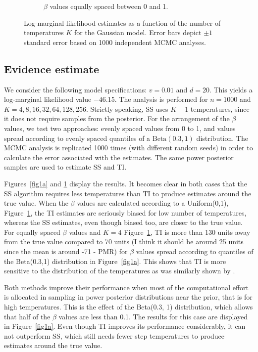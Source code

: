 \documentclass[aps,reprint,amsmath,amssymb,showpacs,showkeys]{revtex4-1}%
\newcommand{\cb}{ \color{blue}}
\begin{document}
\begin{figure}[]
\begin{subfigure}{0.50\textwidth}
		\caption{$\beta$ values equally spaced between 0 and 1.} %
		\label{fig1b}
	\end{subfigure}	
	\caption{Log-marginal likelihood estimates as a function of the number of temperatures $K$ for the Gaussian model.  Error bars depict $\pm1$ standard error based on 1000 independent MCMC analyses.}		
	\label{fig1}
\end{figure}

\subsection{Evidence estimate}

We consider the following model specifications: $v = 0.01$ and $d = 20$.  This yields a log-marginal likelihood value $-46.15$.  The analysis is performed for $n = 1000$ and $K = 4, 8, 16, 32, 64, 128, 256$.  Strictly speaking, SS uses $K-1$ temperatures, since it does not require samples from the posterior.  For the arrangement of the $\beta$ values, we test two approaches: evenly spaced values from 0 to 1, and values spread according to evenly spaced quantiles of a $\text{Beta}(0.3, 1)$ distribution.  The MCMC analysis is replicated 1000 times (with different random seeds) in order to calculate the error associated with the estimates.  The same power posterior samples are used to estimate SS and TI. %

Figures~\ref{fig1a} and \ref{fig1b} display the results. It becomes clear in both cases that the SS algorithm requires less temperatures than TI to produce estimates around the true value.  When the $\beta$ values are calculated according to a Uniform(0,1), Figure~\ref{fig1b}, the TI estimates are seriously biased for low number of temperatures, whereas the SS estimates, even though biased too,  are closer to the true value.  For equally spaced $\beta$ values and $K=4$ Figure~\ref{fig1b}, TI is more than 130 units away from the true value compared to 70 units {\cb (I think it should be around 25 units since the mean is around -71 - PMR)} for $\beta$ values spread according to quantiles of the Beta(0.3,1) distribution  in Figure~\ref{fig1a}.  This shows that TI is more sensitive to the distribution of the temperatures as was similarly shown by \cite{Xie:Lewis:Fan:Kuo:Chen:2011}.

Both methods improve their performance when most of the computational effort is allocated in sampling in power posterior distributions near the prior, that is for high temperatures.  This is the effect of the Beta(0.3, 1) distribution, which allows that half of the $\beta$ values are less than 0.1.  The results for this case are displayed in Figure~\ref{fig1a}.  Even though TI improves its performance considerably, it can not outperform SS, which still needs fewer step temperatures to produce estimates around the true value. 
\end{document}
